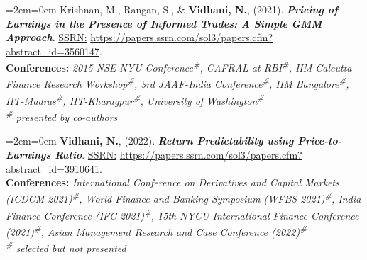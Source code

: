 \documentclass[11pt,a4paper,]{moderncv}
\begin{document}
%
  \par%
  \medskip
  \leftskip=2em\rightskip=0em%
  \noindent\ignorespaces
Krishnan, M., Rangan, S., \& \textbf{Vidhani, N.}, (2021). \textbf{\textit{Pricing of Earnings in the Presence of Informed Trades: A Simple GMM Approach}}. \underline{SSRN:} \url{https://papers.ssrn.com/sol3/papers.cfm?abstract_id=3560147}.\\
\textbf{Conferences:} \textit{2015 NSE-NYU Conference\textsuperscript{\#}, CAFRAL at RBI\textsuperscript{\#}, IIM-Calcutta Finance Research Workshop\textsuperscript{\#}, 3rd JAAF-India Conference\textsuperscript{\#}, IIM Bangalore\textsuperscript{\#}, IIT-Madras\textsuperscript{\#}, IIT-Kharagpur\textsuperscript{\#}, University of Washington\textsuperscript{\#}}\\
\textit{\textsuperscript{\#} presented by co-authors}\\
%
  \par\medskip

%
  \par%
  \medskip
  \leftskip=2em\rightskip=0em%
  \noindent\ignorespaces
\textbf{Vidhani, N.}, (2022). \textbf{\textit{Return Predictability using
Price-to-Earnings Ratio}}. \underline{SSRN:} \url{https://papers.ssrn.com/sol3/papers.cfm?abstract_id=3910641}.\\
\textbf{Conferences:} \textit{International Conference on Derivatives and Capital Markets (ICDCM-2021)\textsuperscript{\#}, World Finance and Banking Symposium (WFBS-2021)\textsuperscript{\#}, India Finance Conference (IFC-2021)\textsuperscript{\#}, 15th NYCU International Finance Conference (2021)\textsuperscript{\#}, Asian Management Research and Case Conference (2022)\textsuperscript{\#}}\\
\textit{\textsuperscript{\#} selected but not presented}\\
%
  \par\medskip

\endgroup
\end{document}
